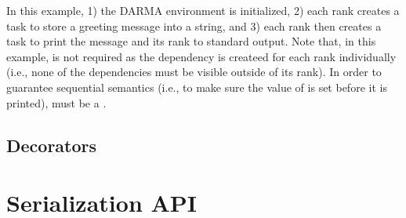 In this example, 1) the DARMA environment is initialized, 2) each rank creates a
task to store a greeting message into a string, and 3) each rank then creates a
task to print the message and its rank to standard output.
Note that, in this example,  is not required as the
dependency  is createed for each rank individually
(i.e., none of the dependencies must be visible outside of its rank).
In order to guarantee \gls{sequential semantics} (i.e., to make sure the value
of  is set before it is printed),
 must be a .


\subsection{Decorators}
\label{subsec:decorators}


\section{Serialization API}
